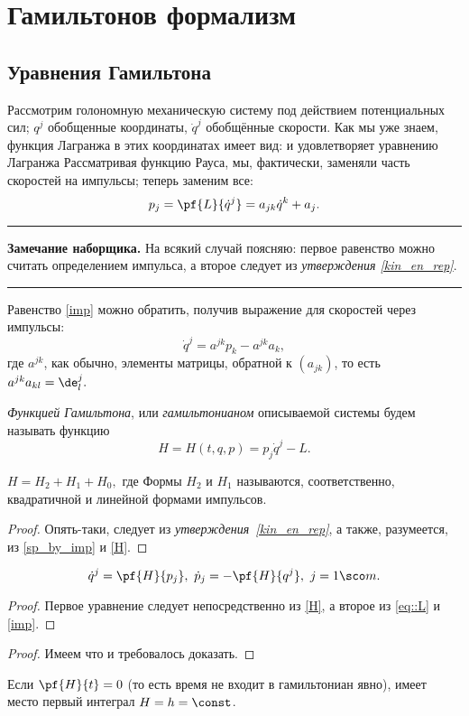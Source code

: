 \documentclass[a4paper,12pt]{article}
\newcommand{\tdf}[1]{\textsl{#1}}
\newcommand{\tstm}[1]{\emph{#1}}
\newenvironment{nbb}{\par\vskip3pt\hrule\vskip3pt\textbf{\footnotesize Замечание наборщика.}\footnotesize }
{\vskip3pt\hrule\par\vskip3pt}
\newcommand{\eql}[2]{\begin{equation}\label{#2}#1\end{equation}}
\begin{document}
\section{Гамильтонов формализм}

\subsection{Уравнения Гамильтона}

Рассмотрим голономную механическую систему под действием потенциальных сил; $q^j$ обобщенные
координаты, $\dot{q}^j$ обобщённые скорости. Как мы уже знаем, функция Лагранжа в этих
координатах имеет вид:
 и
удовлетворяет уравнению Лагранжа
Рассматривая функцию Рауса, мы, фактически, заменяли часть скоростей на импульсы; теперь заменим все:
\eql{p_j=\pf{L}{\dot{q}^j}=a_{jk}\dot{q}^k+a_j.}{imp}

\begin{nbb}
На всякий случай поясняю: первое равенство можно считать определением импульса, а второе
следует из \tdf{утверждения \ref{kin_en_rep}}.
\end{nbb}
Равенство \eqref{imp} можно обратить, получив выражение для скоростей через импульсы:
\eql{\dot{q}^j=a^{jk}p_k-a^{jk}a_k,}{sp_by_imp} где $a^{jk}$, как обычно, элементы матрицы,
обратной к $(a_{jk})$, то есть $a^{jk}a_{kl}=\de^j_l.$
\begin{df}
\tdf{Функцией Гамильтона}, или \tdf{гамильтонианом} описываемой системы будем называть функцию
\eql{H=H(t,q,p)=p_j\dot{q}^j-L.}{H}
\end{df}
\begin{stm}
$H=H_2+H_1+H_0,$ где 
Формы $H_2$ и $H_1$ называются, соответственно, квадратичной и линейной формами импульсов.
\end{stm}
\begin{proof}
Опять-таки, следует из \tstm{утверждения~\ref{kin_en_rep}}, а также, разумеется, из \eqref{sp_by_imp} и
\eqref{H}.
\end{proof}
\begin{theorem}
\eql{\dot{q}^j=\pf{H}{p_j},\ \dot{p}_j=-\pf{H}{q^j},\ j=1\sco
m.}{H_eq}
\end{theorem}
\begin{proof}
Первое уравнение следует непосредственно из \eqref{H}, а второе из \eqref{eq::L} и \eqref{imp}.
\end{proof}
\begin{imp}
\end{imp}
\begin{proof} Имеем
что и требовалось доказать.
\end{proof}
\begin{imp}
Если $\pf{H}{t}=0$ (то есть время не входит в гамильтониан явно),
имеет место первый интеграл $H=h=\const$.
\end{imp}
\end{document}
